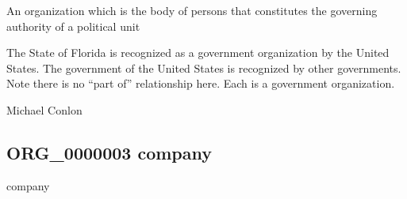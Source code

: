 \documentclass[letterpaper,10pt,english]{sphinxmanual}
\begin{document}
\begin{sphinxShadowBox}

\sphinxAtStartPar
An organization which is the body of persons that constitutes the governing authority of a political unit
\end{sphinxShadowBox}

\begin{sphinxShadowBox}

\sphinxAtStartPar
{}
\end{sphinxShadowBox}

\begin{sphinxShadowBox}

\sphinxAtStartPar
The State of Florida is recognized as a government organization by the United States.  The government of the United States is recognized by other governments.  Note there is no “part of” relationship here.  Each is a government organization.
\end{sphinxShadowBox}

\begin{sphinxShadowBox}

\sphinxAtStartPar
{}
\end{sphinxShadowBox}

\begin{sphinxShadowBox}

\sphinxAtStartPar
Michael Conlon 
\end{sphinxShadowBox}
\begin{quote}

\ignorespaces \end{quote}


\subsection{ORG\_0000003 \sphinxhyphen{} company}
\label{\detokenize{doc-ORG_0000003:org-0000003-company}}\label{\detokenize{doc-ORG_0000003:index-0}}\label{\detokenize{doc-ORG_0000003::doc}}
\begin{sphinxShadowBox}

\sphinxAtStartPar
company
\end{sphinxShadowBox}
\end{document}
